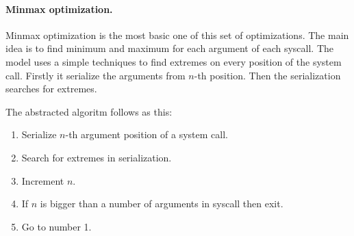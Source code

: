 	\paragraph{Minmax optimization.}
	Minmax optimization is the most basic one of this set of optimizations.
	The main idea is to find minimum and maximum for each argument of each syscall.
	The model uses a simple  techniques to find extremes on every position of the system call.
	Firstly it serialize the arguments from $n$-th position. Then the serialization
	searches for extremes.

	The abstracted algoritm follows as this:
	\begin{enumerate}
		\item Serialize $n$-th argument position of a system call.
		\item Search for extremes in serialization.
		\item Increment $n$.
		\item If $n$ is bigger than a number of arguments in syscall then exit.
		\item Go to number 1.
	\end{enumerate}

